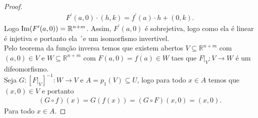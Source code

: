 \begin{proof}
  \begin{align*}
    F^{\prime}(a,0)\cdot(h,k)=f^{\prime}(a)\cdot h+(0,k).
  \end{align*}
  Logo $\operatorname{Im}(F^{\prime}(a,0))=\mathbb{R}^{n+m}$. Assim, $F^{\prime}(a,0)$ é sobrejetiva, logo como ela é linear é injetiva e portanto ela ´e um isomorfismo invertivel.\\
  Pelo teorema da função inversa temos que existem abertos $V\subseteq \mathbb{R}^{n+m}$ com $(a,0)\in V$ e $W\subseteq\mathbb{R}^{n+m}$ com $F(a,0)=f(a)\in W$ taes que $F\big|_{V}:V\to W$ é um difeomorfismo.\\
  Seja $G:\left[ F\big|_{V} \right]^{-1}:W\to V$ e $A=p_1(V)\subseteq U$, logo para todo $x\in A$ temos que $(x,0)\in V$ e portanto
  \begin{align*}
    (G\circ f)(x)=G(f(x))=(G\circ F)(x,0)=(x,0).
  \end{align*}
  Para todo $x\in A$.
\end{proof}
